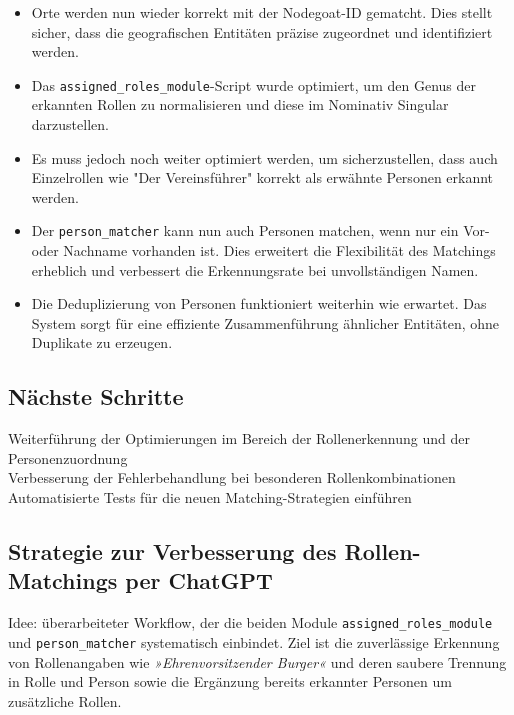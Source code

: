 \documentclass{article}
\begin{document}
\begin{itemize}
    \item Orte werden nun wieder korrekt mit der Nodegoat-ID gematcht. Dies stellt sicher, dass die geografischen Entitäten präzise zugeordnet und identifiziert werden.
    \item Das \texttt{assigned\_roles\_module}-Script wurde optimiert, um den Genus der erkannten Rollen zu normalisieren und diese im Nominativ Singular darzustellen.
    \item Es muss jedoch noch weiter optimiert werden, um sicherzustellen, dass auch Einzelrollen wie "Der Vereinsführer" korrekt als erwähnte Personen erkannt werden.
    \item Der \texttt{person\_matcher} kann nun auch Personen matchen, wenn nur ein Vor- oder Nachname vorhanden ist. Dies erweitert die Flexibilität des Matchings erheblich und verbessert die Erkennungsrate bei unvollständigen Namen.
    \item Die Deduplizierung von Personen funktioniert weiterhin wie erwartet. Das System sorgt für eine effiziente Zusammenführung ähnlicher Entitäten, ohne Duplikate zu erzeugen.
\end{itemize}

\subsection*{Nächste Schritte}
 Weiterführung der Optimierungen im Bereich der Rollenerkennung und der Personenzuordnung\\
 Verbesserung der Fehlerbehandlung bei besonderen Rollenkombinationen\\
 Automatisierte Tests für die neuen Matching-Strategien einführen\\

\subsection*{Strategie zur Verbesserung des Rollen-Matchings per ChatGPT}

Idee: überarbeiteter Workflow, der die beiden Module \texttt{assigned\_roles\_module} und \texttt{person\_matcher} systematisch einbindet. Ziel ist die zuverlässige Erkennung von Rollenangaben wie \textit{»Ehrenvorsitzender Burger«} und deren saubere Trennung in Rolle und Person sowie die Ergänzung bereits erkannter Personen um zusätzliche Rollen.
\end{document}
